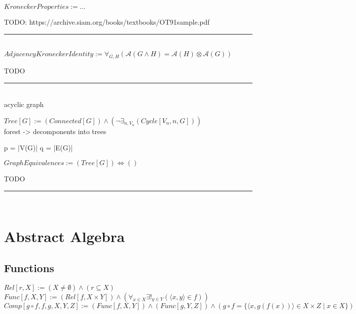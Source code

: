 \documentclass{book}
\newcommand{\abr}{:=}
\newcommand{\pr}[1]{\left(#1\right)}
\newcommand{\st}{\mathbin{|}}
\begin{document}
$KroneckerProperties \abr \ldots$
\begin{enumerate}
  \lit TODO: https://archive.siam.org/books/textbooks/OT91sample.pdf
\end{enumerate} \vspace{.75mm} \hrule \vspace{.75mm} \ \\

$AdjacencyKroneckerIdentity \abr \forall_{G, H}\pr{\mathcal{A}(G \land H) = \mathcal{A}(H) \otimes \mathcal{A}(G)}$
\begin{enumerate}
  \lit TODO
\end{enumerate} \vspace{.75mm} \hrule \vspace{.75mm} \ \\

acyclic graph

$Tree[G] \abr (Connected[G]) \land \pr{\lnot \exists_{n, V_n}(Cycle[V_n, n, G])}$ \\

forest  -> decomponents into trees

p = |V(G)|
q = |E(G)|



$GraphEquivalences \abr (Tree[G]) \iff ()$ \\
\begin{enumerate}
  \lit TODO
\end{enumerate} \vspace{.75mm} \hrule \vspace{.75mm} \ \\














\chapter{Abstract Algebra}
\section{Functions}
$Rel[r, X] \abr (X \neq \emptyset) \land (r \subseteq X)$ \\
$Func[f, X, Y] \abr (Rel[f, X \times Y]) \land \pr{\forall_{x \in X} \exists!_{y \in Y}(\langle x, y \rangle \in f)}$ \\
$Comp[g \circ f, f, g, X, Y, Z] \abr (Func[f, X, Y]) \land (Func[g, Y, Z]) \land \pr{g \circ f = \{\langle x, g\pr{f(x)} \rangle \in X \times Z \st x \in X\}}$ \\
\end{document}

